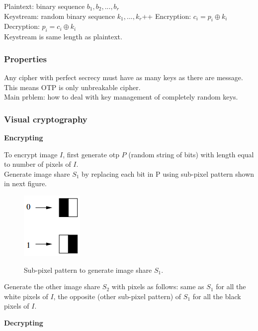 \documentclass{article}
\begin{document}
Plaintext: binary sequence $b_1, b_2, ..., b_r$\\
Keystream: random binary sequence $k_1, ..., k_r$++
Encryption: $c_i = p_i \oplus k_i$\\
Decryption: $p_i = c_i \oplus k_i$\\
Keystream is same length as plaintext.

\subsubsection{Properties}

Any cipher with perfect secrecy must have as many keys as there are message. This means OTP is only unbreakable cipher.\\
Main prblem: how to deal with key management of completely random keys.\\

\subsubsection{Visual cryptography}

\textbf{Encrypting}

To encrypt image $I$, first generate otp $P$ (random string of bits) with length equal to number of pixels of $I$.\\
Generate image share $S_1$ by replacing each bit in P using sub-pixel pattern shown in next figure.
\begin{figure}[H]
\centering
\includegraphics[scale=0.65]{Images/subpixelpattern.png}
\label{fig:subpixel}
\caption{Sub-pixel pattern to generate image share $S_1$.}
\end{figure}
Generate the other image share $S_2$ with pixels as follows: same as $S_1$ for all the white pixels of $I$, the opposite (other sub-pixel pattern) of $S_1$ for all the black pixels of $I$.

\textbf{Decrypting}
\end{document}

